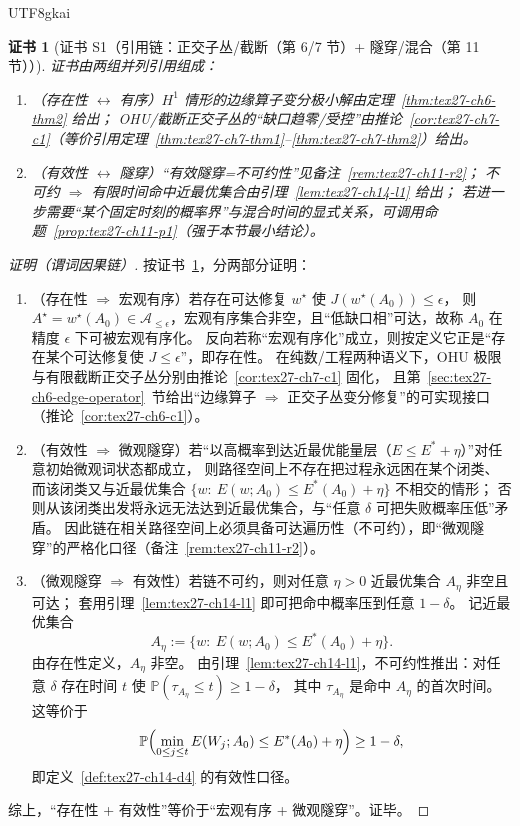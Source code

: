 \documentclass[12pt]{article}
\newtheorem{Certificate}{证书}[section]
\begin{document}
\begin{CJK*}{UTF8}{gkai}
\begin{Certificate}[证书 S1（引用链：正交子丛/截断（第 6/7 节）+ 隧穿/混合（第 11 节））]
\label{cert:tex27-ch14-s1}
证书由两组并列引用组成：
\begin{enumerate}
  \item（存在性 $\leftrightarrow$ 有序）$H^1$ 情形的边缘算子变分极小解由定理~\ref{thm:tex27-ch6-thm2} 给出；
  OHU/截断正交子丛的“缺口趋零/受控”由推论~\ref{cor:tex27-ch7-c1}（等价引用定理~\ref{thm:tex27-ch7-thm1}--\ref{thm:tex27-ch7-thm2}）给出。
  \item（有效性 $\leftrightarrow$ 隧穿）“有效隧穿=不可约性”见备注~\ref{rem:tex27-ch11-r2}；
  不可约 $\Rightarrow$ 有限时间命中近最优集合由引理~\ref{lem:tex27-ch14-l1} 给出；
  若进一步需要“某个固定时刻的概率界”与混合时间的显式关系，可调用命题~\ref{prop:tex27-ch11-p1}（强于本节最小结论）。
\end{enumerate}
\end{Certificate}

\begin{proof}[证明（谓词因果链）]
按证书~\ref{cert:tex27-ch14-s1}，分两部分证明：
\begin{enumerate}
  \item（存在性 $\Rightarrow$ 宏观有序）若存在可达修复 $w^\star$ 使 $J(w^\star(A_0))\le\epsilon$，
  则 $A^\star=w^\star(A_0)\in\mathcal{A}_{\le\epsilon}$，宏观有序集合非空，且“低缺口相”可达，故称 $A_0$ 在精度 $\epsilon$ 下可被宏观有序化。
  反向若称“宏观有序化”成立，则按定义它正是“存在某个可达修复使 $J\le\epsilon$”，即存在性。
  在纯数/工程两种语义下，OHU 极限与有限截断正交子丛分别由推论~\ref{cor:tex27-ch7-c1} 固化，
  且第~\ref{sec:tex27-ch6-edge-operator}~节给出“边缘算子 $\Rightarrow$ 正交子丛变分修复”的可实现接口（推论~\ref{cor:tex27-ch6-c1}）。
  \item（有效性 $\Rightarrow$ 微观隧穿）若“以高概率到达近最优能量层（$E\le E^\ast+\eta$）”对任意初始微观词状态都成立，
  则路径空间上不存在把过程永远困在某个闭类、而该闭类又与近最优集合
  $
    \{w:\ E(w;A_0)\le E^\ast(A_0)+\eta\}
  $
  不相交的情形；
  否则从该闭类出发将永远无法达到近最优集合，与“任意 $\delta$ 可把失败概率压低”矛盾。
  因此链在相关路径空间上必须具备可达遍历性（不可约），即“微观隧穿”的严格化口径（备注~\ref{rem:tex27-ch11-r2}）。
  \item（微观隧穿 $\Rightarrow$ 有效性）若链不可约，则对任意 $\eta>0$ 近最优集合 $A_{\eta}$ 非空且可达；
  套用引理~\ref{lem:tex27-ch14-l1} 即可把命中概率压到任意 $1-\delta$。
  记近最优集合
  \[
    A_{\eta}:=\{w:\ E(w;A_0)\le E^\ast(A_0)+\eta\}.
  \]
  由存在性定义，$A_{\eta}$ 非空。
  由引理~\ref{lem:tex27-ch14-l1}，不可约性推出：对任意 $\delta$ 存在时间 $t$ 使
  $\mathbb{P}(\tau_{A_{\eta}}\le t)\ge 1-\delta$，
  其中 $\tau_{A_{\eta}}$ 是命中 $A_{\eta}$ 的首次时间。
  这等价于
  \[
    \mathbb{P}\Bigl(\min_{0\le j\le t}E(W_j;A_0)\le E^\ast(A_0)+\eta\Bigr)\ge 1-\delta,
  \]
  即定义~\ref{def:tex27-ch14-d4} 的有效性口径。
\end{enumerate}
综上，“存在性 + 有效性”等价于“宏观有序 + 微观隧穿”。证毕。
\end{proof}


\end{CJK*}
\end{document}
